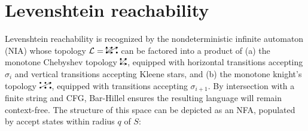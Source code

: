\documentclass[sigplan,review,anonymous,acmsmall]{acmart}\settopmatter{printfolios=false,printccs=false,printacmref=false}
\begin{document}
%
%

\section{Levenshtein reachability}

Levenshtein reachability is recognized by the nondeterministic infinite automaton (NIA) whose topology $\mathcal{L} = \knightkingarrow$ can be factored into a product of (a) the monotone Chebyshev topology $\kingarrow$, equipped with horizontal transitions accepting $\sigma_{i}$ and vertical transitions accepting Kleene stars, and (b) the monotone knight's topology $\knightarrow$, equipped with transitions accepting $\sigma_{i+1}$. By intersection with a finite string and CFG, Bar-Hillel ensures the resulting language will remain context-free. The structure of this space can be depicted as an NFA, populated by accept states within radius $q$ of $S$:
\end{document}

